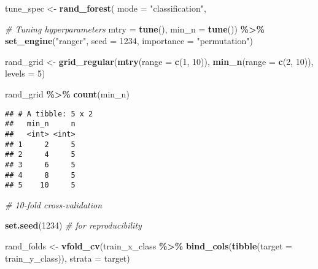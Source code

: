 \documentclass[
]{book}
\newenvironment{Shaded}{\begin{snugshade}}{\end{snugshade}}
\newcommand{\CommentTok}[1]{\textcolor[rgb]{0.56,0.35,0.01}{\textit{#1}}}
\newcommand{\DataTypeTok}[1]{\textcolor[rgb]{0.13,0.29,0.53}{#1}}
\newcommand{\DecValTok}[1]{\textcolor[rgb]{0.00,0.00,0.81}{#1}}
\newcommand{\KeywordTok}[1]{\textcolor[rgb]{0.13,0.29,0.53}{\textbf{#1}}}
\newcommand{\NormalTok}[1]{#1}
\newcommand{\OperatorTok}[1]{\textcolor[rgb]{0.81,0.36,0.00}{\textbf{#1}}}
\newcommand{\StringTok}[1]{\textcolor[rgb]{0.31,0.60,0.02}{#1}}
\begin{document}
\begin{Shaded}
\begin{Highlighting}[]
\NormalTok{tune\_spec \textless{}{-}}\StringTok{ }
\StringTok{  }\KeywordTok{rand\_forest}\NormalTok{(}
           \DataTypeTok{mode =} \StringTok{"classification"}\NormalTok{,}
           
           \CommentTok{\# Tuning hyperparameters}
           \DataTypeTok{mtry =} \KeywordTok{tune}\NormalTok{(), }
           \DataTypeTok{min\_n =} \KeywordTok{tune}\NormalTok{()) }\OperatorTok{\%\textgreater{}\%}
\StringTok{  }\KeywordTok{set\_engine}\NormalTok{(}\StringTok{"ranger"}\NormalTok{,}
             \DataTypeTok{seed =} \DecValTok{1234}\NormalTok{, }
             \DataTypeTok{importance =} \StringTok{"permutation"}\NormalTok{)}

\NormalTok{rand\_grid \textless{}{-}}\StringTok{ }\KeywordTok{grid\_regular}\NormalTok{(}\KeywordTok{mtry}\NormalTok{(}\DataTypeTok{range =} \KeywordTok{c}\NormalTok{(}\DecValTok{1}\NormalTok{, }\DecValTok{10}\NormalTok{)),}
                          \KeywordTok{min\_n}\NormalTok{(}\DataTypeTok{range =} \KeywordTok{c}\NormalTok{(}\DecValTok{2}\NormalTok{, }\DecValTok{10}\NormalTok{)),}
                          \DataTypeTok{levels =} \DecValTok{5}\NormalTok{)}

\NormalTok{rand\_grid }\OperatorTok{\%\textgreater{}\%}
\StringTok{  }\KeywordTok{count}\NormalTok{(min\_n)}
\end{Highlighting}
\end{Shaded}

\begin{verbatim}
## # A tibble: 5 x 2
##   min_n     n
##   <int> <int>
## 1     2     5
## 2     4     5
## 3     6     5
## 4     8     5
## 5    10     5
\end{verbatim}

\begin{Shaded}
\begin{Highlighting}[]
\CommentTok{\# 10{-}fold cross{-}validation}

\KeywordTok{set.seed}\NormalTok{(}\DecValTok{1234}\NormalTok{) }\CommentTok{\# for reproducibility }

\NormalTok{rand\_folds \textless{}{-}}\StringTok{ }\KeywordTok{vfold\_cv}\NormalTok{(train\_x\_class }\OperatorTok{\%\textgreater{}\%}\StringTok{ }\KeywordTok{bind\_cols}\NormalTok{(}\KeywordTok{tibble}\NormalTok{(}\DataTypeTok{target =}\NormalTok{ train\_y\_class)),}
                       \DataTypeTok{strata =}\NormalTok{ target)}
\end{Highlighting}
\end{Shaded}
\end{document}

